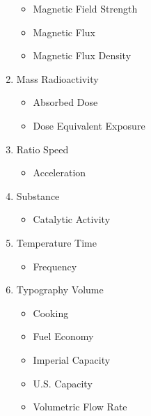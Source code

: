 \documentclass{article}
\begin{document}
\begin{enumerate}[label=\alph*) ]
		\begin{itemize}
			\item Magnetic Field Strength
			\item Magnetic Flux
			\item Magnetic Flux Density
		\end{itemize}
		\item Mass Radioactivity
		\begin{itemize}
			\item Absorbed Dose
			\item Dose Equivalent Exposure
		\end{itemize}
		\item Ratio Speed
		\begin{itemize}
			\item Acceleration
		\end{itemize}
		\item Substance
		\begin{itemize}
			\item Catalytic Activity
		\end{itemize}
		\item Temperature Time
		\begin{itemize}
			\item Frequency
		\end{itemize}
		\item Typography Volume
		\begin{itemize}
			\item Cooking
			\item Fuel Economy
			\item Imperial Capacity
			\item U.S. Capacity
			\item Volumetric Flow Rate
		\end{itemize}
	\end{enumerate}
\end{document}
